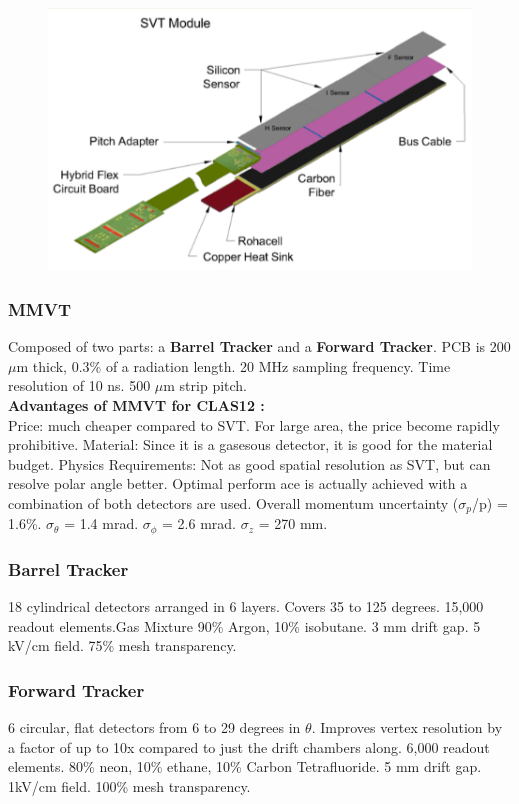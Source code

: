 			
			 \begin{figure}[H]
    			\centering
    			\includegraphics[width=12cm]{Chapters/Ch2-Experiment/clas-12-system/pics/cd/svt-module.PNG}
			\end{figure}  
			
		
		\subsubsection{MMVT}
		    Composed of two parts: a \textbf{Barrel Tracker} and a \textbf{Forward Tracker}. PCB is 200 $\mu$m thick, 0.3\% of a radiation length. 20 MHz sampling frequency. Time resolution of 10 ns. 500 $\mu$m strip pitch.\\
		    \textbf{Advantages of MMVT for CLAS12 :} \\
		    Price: much cheaper compared to SVT. For large area, the price become rapidly prohibitive.
		    Material: Since it is a gasesous detector, it is good for the material budget.
		    Physics Requirements: Not as good spatial resolution as SVT, but can resolve polar angle better. Optimal perform ace is actually achieved with a combination of both detectors are used.
		    \newline
		    Overall momentum uncertainty ($\sigma_p$/p) = 1.6\%. $\sigma_{\theta}$ = 1.4 mrad.  $\sigma_{\phi}$ = 2.6 mrad.  $\sigma _{z}$ = 270 mm.  
		    \subsubsection{Barrel Tracker}
		        18 cylindrical detectors arranged in 6 layers. Covers 35 to 125 degrees. 15,000 readout elements.Gas Mixture 90\% Argon, 10\% isobutane. 3 mm drift gap. 5 kV/cm field. 75\% mesh transparency.
		    \subsubsection{Forward Tracker}
		        6 circular, flat detectors from 6 to 29 degrees in $\theta$. Improves vertex resolution by a factor of up to 10x compared to just the drift chambers along. 6,000 readout elements. 80\% neon, 10\% ethane, 10\% Carbon Tetrafluoride. 5 mm drift gap. 1kV/cm field. 100\% mesh transparency.
		        
